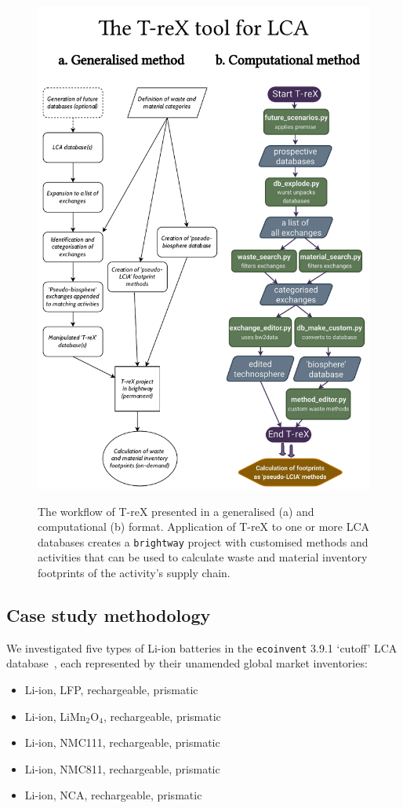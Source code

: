 \documentclass[a4paper,fleqn]{cas-dc}
\begin{document}
\begin{figure}[!htbp]
	\centering
	\caption{The workflow of T-reX presented in a generalised (a) and computational (b) format. Application of T-reX to one or more LCA databases creates a \texttt{brightway} project with customised methods and activities that can be used to calculate waste and material inventory footprints of the activity's supply chain.}
	\includegraphics[width=1.8\columnwidth]{figs/T-reX_method.pdf}\label{fig:methods-flowchart}
\end{figure}


\subsection{Case study methodology}\label{sec:method-casestudy}

We investigated five types of Li-ion batteries in the \texttt{ecoinvent} 3.9.1 `cutoff' LCA database~\citep{ecoinvent2016version3}, each represented by their unamended global market inventories:
\begin{itemize}[itemsep=0pt]
	\item Li-ion, LFP, rechargeable, prismatic
	\item Li-ion, LiMn\(_2\)O\(_4\), rechargeable, prismatic
	\item Li-ion, NMC111, rechargeable, prismatic
	\item Li-ion, NMC811, rechargeable, prismatic
	\item Li-ion, NCA, rechargeable, prismatic
\end{itemize}
\end{document}
